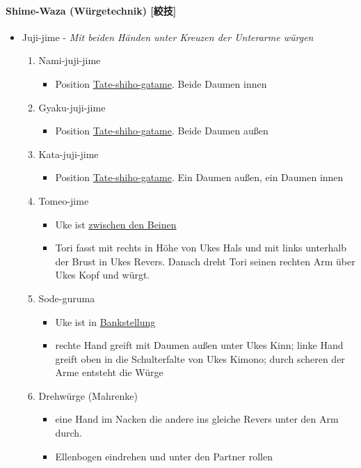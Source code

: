 \documentclass[justified, a4paper, notitlepage, captions=tableheading, nobib]{tufte-handout}
\begin{document}
\paragraph{Shime-Waza (Würgetechnik) [絞技] }
\label{sec:org7b0c9f8}
\begin{itemize}
\item \label{org40ebf6d}Juji-jime - \emph{Mit beiden Händen unter Kreuzen der Unterarme würgen}

\begin{enumerate}
\item \label{org26cc498}Nami-juji-jime 
\begin{itemize}
\item Position \hyperref[orgb33e717]{Tate-shiho-gatame}. Beide Daumen innen
\end{itemize}
\item \label{orgcb6d4bc}Gyaku-juji-jime 
\begin{itemize}
\item Position \hyperref[orgb33e717]{Tate-shiho-gatame}. Beide Daumen außen
\end{itemize}
\item \label{orgcb073d1}Kata-juji-jime 
\begin{itemize}
\item Position \hyperref[orgb33e717]{Tate-shiho-gatame}. Ein Daumen außen, ein Daumen innen
\end{itemize}
\item \label{orgfead7d8}Tomeo-jime
\begin{itemize}
\item Uke ist \hyperref[org9bede9d]{zwischen den Beinen}
\item Tori fasst mit rechts in Höhe von Ukes Hals und mit links unterhalb der Brust in Ukes Revers. Danach dreht Tori seinen rechten Arm über Ukes Kopf und würgt.
\end{itemize}
\item \label{org27c6810}Sode-guruma
\begin{itemize}
\item Uke ist in \hyperref[orgd4877a8]{Bankstellung}
\item rechte Hand greift mit Daumen außen unter Ukes Kinn; linke Hand greift oben in die Schulterfalte von Ukes Kimono; durch scheren der Arme entsteht die Würge
\end{itemize}
\item \label{orgf618d5a}Drehwürge (\label{orgbf58755}Mahrenke) 
\begin{itemize}
\item eine Hand im Nacken die andere ins gleiche Revers unter den Arm durch.
\item Ellenbogen eindrehen und unter den Partner rollen
\end{itemize}
\end{enumerate}


\end{itemize}
\end{document}
